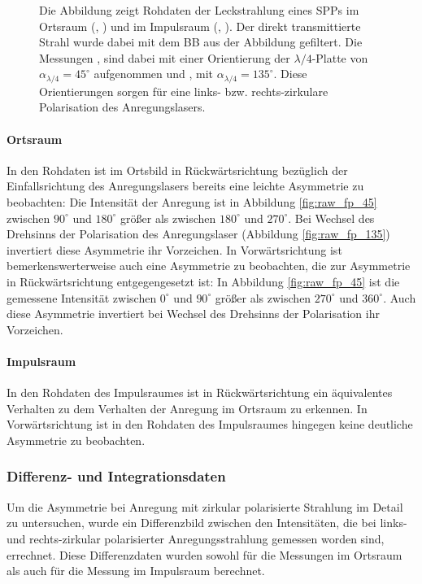 \documentclass[titlepage,  ngerman]{article}
\begin{document}
\begin{figure}
\begin{subfigure}[b]{0.5\textwidth}
		\end{subfigure}
		\caption[Rohdaten PSHE]{Die Abbildung zeigt Rohdaten der Leckstrahlung eines SPPs im Ortsraum (, ) und im Impulsraum (, ). Der direkt transmittierte Strahl wurde dabei mit dem BB aus der Abbildung gefiltert. Die Messungen ,  sind dabei mit einer Orientierung der $\lambda / 4$-Platte von $\alpha_{\lambda/4} = 45^\circ$ aufgenommen und ,  mit $\alpha_{\lambda/4} = 135^\circ$. Diese Orientierungen sorgen für eine links- bzw. rechts-zirkulare Polarisation des Anregungslasers.}
		\label{fig:measure_pshe_raw}			
	\end{figure}
	\paragraph{Ortsraum}
	In den Rohdaten ist im Ortsbild in Rückwärtsrichtung bezüglich der Einfallsrichtung des Anregungslasers bereits eine leichte Asymmetrie zu beobachten: Die Intensität der Anregung ist in Abbildung \ref{fig:raw_fp_45} zwischen $90^\circ$ und $180^\circ$ größer als zwischen $180^\circ$ und $270^\circ$. Bei Wechsel des Drehsinns der Polarisation des Anregungslaser (Abbildung \ref{fig:raw_fp_135}) invertiert diese Asymmetrie ihr Vorzeichen. In Vorwärtsrichtung ist bemerkenswerterweise auch eine Asymmetrie zu beobachten, die zur Asymmetrie in Rückwärtsrichtung entgegengesetzt ist: In Abbildung \ref{fig:raw_fp_45} ist die gemessene Intensität zwischen $0^\circ$ und $90^\circ$ größer als zwischen $270^\circ$ und $360^\circ$. Auch diese Asymmetrie invertiert bei Wechsel des Drehsinns der Polarisation ihr Vorzeichen.
	\paragraph{Impulsraum} 
	In den Rohdaten des Impulsraumes ist in Rückwärtsrichtung ein äquivalentes Verhalten zu dem Verhalten der Anregung im Ortsraum zu erkennen. In Vorwärtsrichtung ist in den Rohdaten des Impulsraumes hingegen keine deutliche Asymmetrie zu beobachten.
	\FloatBarrier
	\subsubsection{Differenz- und Integrationsdaten}
		Um die Asymmetrie bei Anregung mit zirkular polarisierte Strahlung im Detail zu untersuchen, wurde ein Differenzbild zwischen den Intensitäten, die bei links- und rechts-zirkular polarisierter Anregungsstrahlung gemessen worden sind, errechnet. Diese Differenzdaten wurden sowohl für die Messungen im Ortsraum als auch für die Messung im Impulsraum berechnet.			
\end{document}
